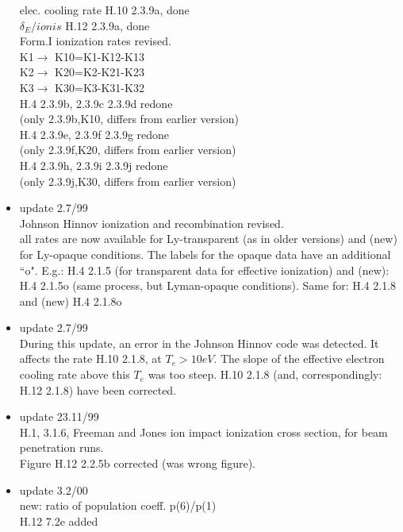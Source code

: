 \documentclass[12pt,dvipdfmx]{article}
\begin{document}
\begin{itemize}
               elec. cooling rate  H.10 2.3.9a, done \\
              $\delta_E/ionis$     H.12 2.3.9a, done \\
  Form.I ionization rates revised. \\
   K1$\rightarrow$ K10=K1-K12-K13 \\
   K2$\rightarrow$ K20=K2-K21-K23 \\
   K3$\rightarrow$ K30=K3-K31-K32 \\
               H.4 2.3.9b, 2.3.9c 2.3.9d  redone \\
               (only 2.3.9b,K10, differs from earlier version)\\
               H.4 2.3.9e, 2.3.9f 2.3.9g  redone \\
               (only 2.3.9f,K20, differs from earlier version)\\
               H.4 2.3.9h, 2.3.9i 2.3.9j  redone \\
               (only 2.3.9j,K30, differs from earlier version)\\
 \item update   2.7/99 \\
  Johnson Hinnov ionization and recombination revised.\\
  all rates are now available for Ly-transparent (as in older versions)
  and (new) for Ly-opaque conditions. The labels for the opaque
  data have an additional ``o". E.g.: H.4 2.1.5 (for transparent
  data for effective ionization) and (new): H.4 2.1.5o (same process,
  but Lyman-opaque conditions). Same for: H.4 2.1.8 and (new) H.4 2.1.8o
 \item update   2.7/99 \\
  During this update, an error in the Johnson Hinnov code was detected.
  It affects the rate H.10 2.1.8, at $T_e > 10 eV$. The slope of the
  effective electron cooling rate above this $T_e$ was too steep.
  H.10 2.1.8  (and, correspondingly: H.12 2.1.8) have been corrected.
 \item update   23.11/99 \\
  H.1, 3.1.6, Freeman and Jones ion impact ionization cross section,
  for beam penetration runs.\\
  Figure H.12 2.2.5b corrected (was wrong figure).
 \item update   3.2/00 \\
  new: ratio of population coeff. p(6)/p(1)\\
  H.12 7.2e added                            \\

\end{itemize}
\end{document}
